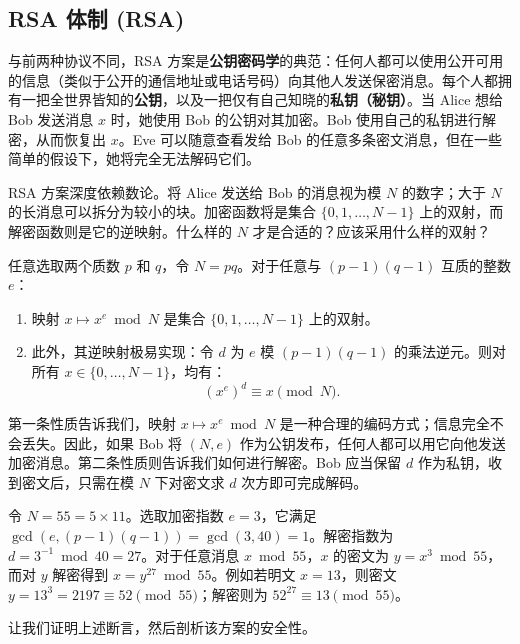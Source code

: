 \subsection{RSA 体制 (RSA)}
与前两种协议不同，RSA 方案是\textbf{公钥密码学}的典范：任何人都可以使用公开可用的信息（类似于公开的通信地址或电话号码）向其他人发送保密消息。每个人都拥有一把全世界皆知的\textbf{公钥}，以及一把仅有自己知晓的\textbf{私钥（秘钥）}。当 Alice 想给 Bob 发送消息 $x$ 时，她使用 Bob 的公钥对其加密。Bob 使用自己的私钥进行解密，从而恢复出 $x$。Eve 可以随意查看发给 Bob 的任意多条密文消息，但在一些简单的假设下，她将完全无法解码它们。

RSA 方案深度依赖数论。将 Alice 发送给 Bob 的消息视为模 $N$ 的数字；大于 $N$ 的长消息可以拆分为较小的块。加密函数将是集合 $\{0, 1, \dots, N-1\}$ 上的双射，而解密函数则是它的逆映射。什么样的 $N$ 才是合适的？应该采用什么样的双射？

\begin{property}
任意选取两个质数 $p$ 和 $q$，令 $N = pq$。对于任意与 $(p-1)(q-1)$ 互质的整数 $e$：
\begin{enumerate}
    \item 映射 $x \mapsto x^e \bmod N$ 是集合 $\{0, 1, \dots, N-1\}$ 上的双射。
    \item 此外，其逆映射极易实现：令 $d$ 为 $e$ 模 $(p-1)(q-1)$ 的乘法逆元。则对所有 $x \in \{0, \dots, N-1\}$，均有：
    \[
    (x^e)^d \equiv x \pmod N.
    \]
\end{enumerate}
\end{property}

第一条性质告诉我们，映射 $x \mapsto x^e \bmod N$ 是一种合理的编码方式；信息完全不会丢失。因此，如果 Bob 将 $(N, e)$ 作为公钥发布，任何人都可以用它向他发送加密消息。第二条性质则告诉我们如何进行解密。Bob 应当保留 $d$ 作为私钥，收到密文后，只需在模 $N$ 下对密文求 $d$ 次方即可完成解码。

\begin{example}
令 $N = 55 = 5 \times 11$。选取加密指数 $e = 3$，它满足 $\gcd(e, (p-1)(q-1)) = \gcd(3, 40) = 1$。解密指数为 $d = 3^{-1} \bmod 40 = 27$。对于任意消息 $x \bmod 55$，$x$ 的密文为 $y = x^3 \bmod 55$，而对 $y$ 解密得到 $x = y^{27} \bmod 55$。例如若明文 $x = 13$，则密文 $y = 13^3 = 2197 \equiv 52 \pmod{55}$；解密则为 $52^{27} \equiv 13 \pmod{55}$。
\end{example}

让我们证明上述断言，然后剖析该方案的安全性。

